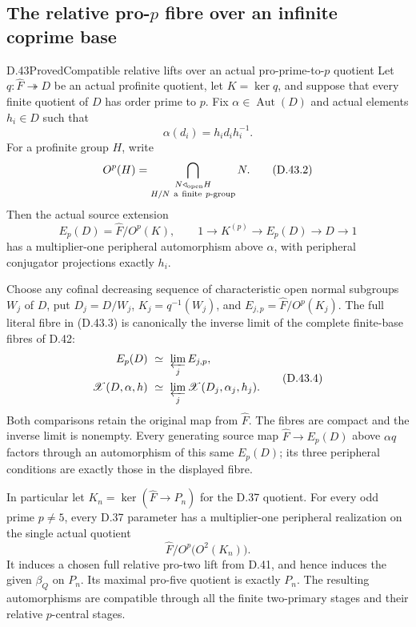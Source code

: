 \subsection{The relative pro-\texorpdfstring{\(p\)}{p} fibre over an infinite coprime base}

\begin{statement}{D.43}{Proved}{Compatible relative lifts over an actual pro-prime-to-$p$ quotient}
Let \(q:\widehat F\twoheadrightarrow D\) be an actual
profinite quotient, let \(K=\ker q\), and suppose that
every finite quotient of \(D\) has order prime to \(p\).
Fix \(\alpha\in\operatorname{Aut}(D)\) and actual
elements \(h_i\in D\) such that
\[
                  \alpha(d_i)=h_i d_i h_i^{-1}.
 \tag{D.43.1}
\]
For a profinite group \(H\), write
\[
 O^p(H)=
 \bigcap_{\substack{N\triangleleft_{\mathrm{open}}H\\
                         H/N\ {\rm a\ finite}\ p{\rm\text{-}group}}}N.
 \tag{D.43.2}
\]
Then the actual source extension
\[
 E_p(D)=\widehat F/O^p(K),\qquad
        1\longrightarrow K^{(p)}
          \longrightarrow E_p(D)\longrightarrow D\longrightarrow1
 \tag{D.43.3}
\]
has a multiplier-one peripheral automorphism above
\(\alpha\), with peripheral conjugator projections
exactly \(h_i\).

Choose any cofinal decreasing sequence of
characteristic open normal subgroups \(W_j\) of \(D\),
put \(D_j=D/W_j\), \(K_j=q^{-1}(W_j)\), and
\(E_{j,p}=\widehat F/O^p(K_j)\).
The full literal fibre in \textup{(D.43.3)} is
canonically the inverse limit of the complete
finite-base fibres of D.42:
\[
 \begin{split}
 E_p(D)&\ \simeq\ \varprojlim_j E_{j,p},\\
 \mathscr X(D,\alpha,h)&\ \simeq\
             \varprojlim_j\mathscr X(D_j,\alpha_j,h_j).
 \end{split}
 \tag{D.43.4}
\]
Both comparisons retain the original map from
\(\widehat F\).
The fibres are compact and the inverse limit
is nonempty.
Every generating source map
\(\widehat F\to E_p(D)\) above \(\alpha q\)
factors through an automorphism of this same
\(E_p(D)\); its three peripheral conditions
are exactly those in the displayed fibre.

In particular let \(K_n=\ker(\widehat F\to P_n)\)
for the D.37 quotient.
For every odd prime \(p\ne5\), every D.37
parameter has a multiplier-one peripheral
realization on the single actual quotient
\[
       \widehat F/
             O^p\bigl(O^2(K_n)\bigr).
 \tag{D.43.5}
\]
It induces a chosen full relative pro-two
lift from D.41, and hence induces the given
\(\beta_Q\) on \(P_n\).
Its maximal pro-five quotient is exactly
\(P_n\).
The resulting automorphisms are compatible
through all the finite two-primary stages
and their relative \(p\)-central stages.
\end{statement}

